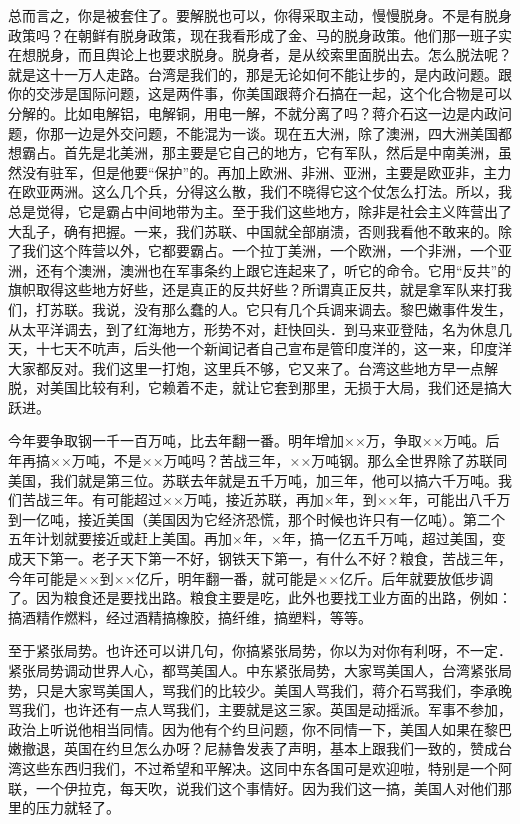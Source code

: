 总而言之，你是被套住了。要解脱也可以，你得采取主动，慢慢脱身。不是有脱身政策吗？在朝鲜有脱身政策，现在我看形成了金、马的脱身政策。他们那一班子实在想脱身，而且舆论上也要求脱身。脱身者，是从绞索里面脱出去。怎么脱法呢？就是这十一万人走路。台湾是我们的，那是无论如何不能让步的，是内政问题。跟你的交涉是国际问题，这是两件事，你美国跟蒋介石搞在一起，这个化合物是可以分解的。比如电解铝，电解铜，用电一解，不就分离了吗？蒋介石这一边是内政问题，你那一边是外交问题，不能混为一谈。现在五大洲，除了澳洲，四大洲美国都想霸占。首先是北美洲，那主要是它自己的地方，它有军队，然后是中南美洲，虽然没有驻军，但是他要“保护”的。再加上欧洲、非洲、亚洲，主要是欧亚非，主力在欧亚两洲。这么几个兵，分得这么散，我们不晓得它这个仗怎么打法。所以，我总是觉得，它是霸占中间地带为主。至于我们这些地方，除非是社会主义阵营出了大乱子，确有把握。一来，我们苏联、中国就全部崩溃，否则我看他不敢来的。除了我们这个阵营以外，它都要霸占。一个拉丁美洲，一个欧洲，一个非洲，一个亚洲，还有个澳洲，澳洲也在军事条约上跟它连起来了，听它的命令。它用“反共”的旗帜取得这些地方好些，还是真正的反共好些？所谓真正反共，就是拿军队来打我们，打苏联。我说，没有那么蠢的人。它只有几个兵调来调去。黎巴嫩事件发生，从太平洋调去，到了红海地方，形势不对，赶快回头．到马来亚登陆，名为休息几天，十七天不吭声，后头他一个新闻记者自己宣布是管印度洋的，这一来，印度洋大家都反对。我们这里一打炮，这里兵不够，它又来了。台湾这些地方早一点解脱，对美国比较有利，它赖着不走，就让它套到那里，无损于大局，我们还是搞大跃进。

今年要争取钢一千一百万吨，比去年翻一番。明年增加××万，争取××万吨。后年再搞××万吨，不是××万吨吗？苦战三年，××万吨钢。那么全世界除了苏联同美国，我们就是第三位。苏联去年就是五千万吨，加三年，他可以搞六千万吨。我们苦战三年。有可能超过××万吨，接近苏联，再加×年，到××年，可能出八千万到一亿吨，接近美国（美国因为它经济恐慌，那个时候也许只有一亿吨）。第二个五年计划就要接近或赶上美国。再加×年，×年，搞一亿五千万吨，超过美国，变成天下第一。老子天下第一不好，钢铁天下第一，有什么不好？粮食，苦战三年，今年可能是××到××亿斤，明年翻一番，就可能是××亿斤。后年就要放低步调了。因为粮食还是要找出路。粮食主要是吃，此外也要找工业方面的出路，例如：搞酒精作燃料，经过酒精搞橡胶，搞纤维，搞塑料，等等。

至于紧张局势。也许还可以讲几句，你搞紧张局势，你以为对你有利呀，不一定．紧张局势调动世界人心，都骂美国人。中东紧张局势，大家骂美国人，台湾紧张局势，只是大家骂美国人，骂我们的比较少。美国人骂我们，蒋介石骂我们，李承晚骂我们，也许还有一点人骂我们，主要就是这三家。英国是动摇派。军事不参加，政治上听说他相当同情。因为他有个约旦问题，你不同情一下，美国人如果在黎巴嫩撤退，英国在约旦怎么办呀？尼赫鲁发表了声明，基本上跟我们一致的，赞成台湾这些东西归我们，不过希望和平解决。这同中东各国可是欢迎啦，特别是一个阿联，一个伊拉克，每天吹，说我们这个事情好。因为我们这一搞，美国人对他们那里的压力就轻了。

